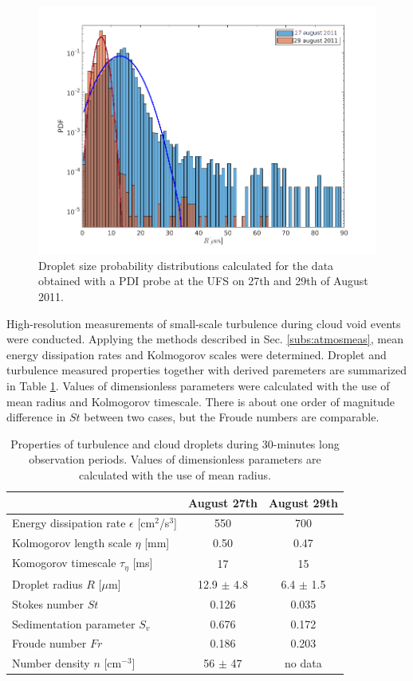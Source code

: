 \documentclass[../main.tex]{subfiles}
\begin{document}
\begin{figure}[h]
\centering
\noindent\includegraphics[width=30pc]{gfx/PDFs_log.png}
\caption{Droplet size probability distributions calculated for the data obtained with a PDI probe at the UFS on 27th and 29th of August 2011.}
\label{fig:ch4_2}
\end{figure}

High-resolution measurements of small-scale turbulence during cloud void events were conducted. Applying the methods described in Sec. \autoref{subs:atmosmeas}, mean energy dissipation rates and Kolmogorov scales were determined. Droplet and turbulence measured properties together with derived paremeters are summarized in Table \ref{tab:ch4_1}. Values of dimensionless parameters were calculated with the use of mean radius and Kolmogorov timescale. There is about one order of magnitude difference in $St$ between two cases, but the Froude numbers are comparable.

\begin{table}
\small
\tabcolsep=0.2cm
\caption{Properties of turbulence and cloud droplets during 30-minutes long observation periods. Values of dimensionless parameters are calculated with the use of mean radius.}
\centering
\begin{tabular}{|l|c|c|}
\hline
  & August 27th & August 29th\\
\hline
 Energy dissipation rate $\epsilon$ [cm$^2$/s$^3$] & 550 & 700 \\
\hline
 Kolmogorov length scale $\eta$ [mm] & 0.50  & 0.47\\
\hline
Komogorov timescale $\tau_{\eta}$ [ms] & 17 & 15\\
\hline
Droplet radius $R$ [$\mu$m] & 12.9 $\pm$ 4.8 & 6.4 $\pm$ 1.5\\
\hline
 Stokes number $St$ & 0.126  & 0.035\\
\hline
 Sedimentation parameter $S_v$ & 0.676  & 0.172\\
 \hline
 Froude number $Fr$ & 0.186  & 0.203\\
 \hline
 Number density $n$ [cm$^{-3}$] & 56 $\pm$ 47 & no data\\
 \hline
\end{tabular}
\label{tab:ch4_1}
\end{table}
\end{document}
